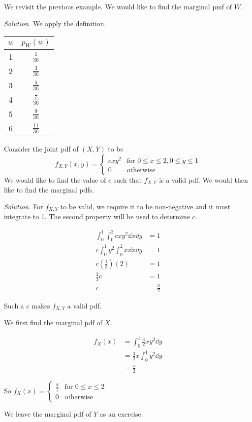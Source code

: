 \begin{example}[]
	We revisit the previous example. We would like to find the marginal pmf of $W$.

	\textit{Solution.} We apply the definition.
	\begin{center}
	\begin{tabular}{c | c}
		$w$ & $p_W(w)$\\ \hline
		1 & $\frac{1}{36}$\\
		2 & $\frac{3}{36}$\\
		3 & $\frac{5}{36}$\\
		4 & $\frac{7}{36}$\\
		5 & $\frac{9}{36}$\\
		6 & $\frac{11}{36}$
	\end{tabular}
	\end{center}
\end{example}


\begin{example}[]
	Consider the joint pdf of $(X,Y)$ to be
	$$f_{X,Y}(x,y)=\begin{cases}
		cxy^2 & \text{for $0\leq x\leq 2,0\leq y\leq 1$}\\
		0 & \text{otherwise}
	\end{cases}$$
	We would like to find the value of $c$ such that $f_{X,Y}$ is a valid pdf. We would then like to find the marginal pdfs.

	\textit{Solution.} For $f_{X,Y}$ to be valid, we require it to be non-negative and it must integrate to 1. The second property will be used to determine $c$.

	\begin{align*}
		\int_0^1\int_0^2 cxy^2\dd x\dd y & =1\\
		c\int_0^1y^2\int_0^2 x\dd x\dd y & =1\\
		c\left(\frac 13\right)(2)&=1\\
		\frac 23 c&=1\\
		c&=\frac 32
	\end{align*}

	Such a $c$ makes $f_{X,Y}$ a valid pdf.

	We first find the marginal pdf of $X$.

	\begin{align*}
		f_X(x)&=\int_0^1\frac 32xy^2\dd y\\
		&=\frac 32x\int_0^1y^2\dd y\\
		&=\frac x2
	\end{align*}

	So $f_X(x)=\begin{cases}
		\frac x 2 & \text{for $0\leq x\leq 2$}\\
		0 & \text{otherwise}
	\end{cases}$

	We leave the marginal pdf of $Y$ as an exercise.
\end{example}

